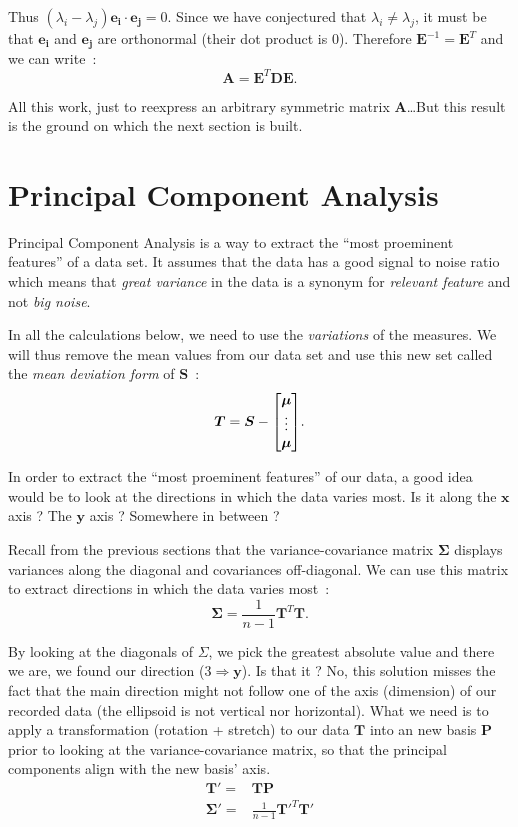 \documentclass[11pt,twocolumn]{amsart} %
\newcommand{\ve}[1]{\boldsymbol{#1}}
\newcommand{\ma}[1]{\boldsymbol{#1}}
\newenvironment{m}{\begin{bmatrix}}{\end{bmatrix}}
\begin{document}
Thus $(\lambda_i - \lambda_j)\ve{e_i} \cdot \ve{e_j} = 0$. Since we have conjectured that $\lambda_i \not= \lambda_j$, it must be that $\ve{e_i}$ and $\ve{e_j}$ are orthonormal (their dot product is $0$). Therefore $\ma{E}^{-1} = \ma{E}^T$ and we can write~:
\[
  \ma{A} = \ma{E}^T\ma{D}\ma{E}.
\]

All this work, just to reexpress an arbitrary symmetric matrix $\ma{A}$\dots But this result is the ground on which the next section is built.

\section{Principal Component Analysis}

Principal Component Analysis is a way to extract the ``most proeminent features'' of a data set. It assumes that the data has a good signal to noise ratio which means that \emph{great variance} in the data is a synonym for \emph{relevant feature} and not \emph{big noise}.

In all the calculations below, we need to use the \emph{variations} of the measures. We will thus remove the mean values from our data set and use this new set called the \emph{mean deviation form} of $\ma{S}$~:
\[
  \ma{T} = \ma{S} - \begin{m}\ve{\mu} \\ \vdots \\ \ve{\mu}\end{m}.
\]

In order to extract the ``most proeminent features'' of our data, a good idea would be to look at the directions in which the data varies most. Is it along the $\ve{x}$ axis ? The $\ve{y}$ axis ? Somewhere in between ?

Recall from the previous sections that the variance-covariance matrix $\ma\Sigma$ displays variances along the diagonal and covariances off-diagonal. We can use this matrix to extract directions in which the data varies most~:
\[
  \ma\Sigma = \frac{1}{n-1}\ma{T}^T\ma{T}.
\]

By looking at the diagonals of $\Sigma$, we pick the greatest absolute value and there we are, we found our direction ($3 \Rightarrow \ve{y}$). Is that it ? No, this solution misses the fact that the main direction might not follow one of the axis (dimension) of our recorded data (the ellipsoid is not vertical nor horizontal). What we need is to apply a transformation (rotation + stretch) to our data $\ma{T}$ into an new basis $\ma{P}$ prior to looking at the variance-covariance matrix, so that the principal components align with the new basis' axis.
\begin{align*}
  \ma{T'} = & \ma{T}\ma{P} \\
  \ma\Sigma'     = & \frac{1}{n-1}\ma{T'}^T\ma{T'}
\end{align*}
\end{document}
